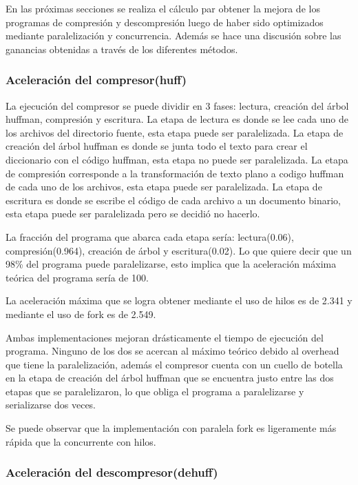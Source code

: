 \documentclass{report}
\begin{document}
En las próximas secciones se realiza el cálculo par obtener la mejora de los programas de compresión y descompresión luego de haber sido optimizados mediante paralelización y concurrencia. Además se hace una discusión sobre las ganancias obtenidas a través de los diferentes métodos.

\subsubsection{Aceleración del compresor(huff)}

La ejecución del compresor se puede dividir en 3 fases: lectura, creación del árbol huffman, compresión y escritura. La etapa de lectura es donde se lee cada uno de los archivos del directorio fuente, esta etapa puede ser paralelizada.  La etapa de creación del  árbol huffman es donde se junta todo el texto para crear el diccionario con el código huffman, esta etapa no puede ser paralelizada. La etapa de compresión corresponde a la transformación de texto plano a codigo huffman de cada uno de los archivos, esta etapa puede ser paralelizada. La etapa de escritura es donde se escribe el código de cada archivo a un documento binario, esta etapa puede ser paralelizada pero se decidió no hacerlo.

La fracción del programa que abarca cada etapa sería: lectura(0.06), compresión(0.964), creación de árbol y escritura(0.02).  Lo que quiere decir que un 98\% del programa puede paralelizarse, esto implica que la aceleración máxima teórica del programa sería de 100.

La aceleración máxima que se logra obtener mediante el uso de hilos es de 2.341 y mediante el uso de fork es de 2.549. 

Ambas implementaciones mejoran drásticamente el tiempo de ejecución del programa. Ninguno de los dos se acercan al máximo teórico debido al overhead que tiene la paralelización, además el compresor cuenta con un cuello de botella en la etapa de creación del árbol huffman que se encuentra justo entre las dos etapas que se paralelizaron, lo que obliga el programa  a paralelizarse y serializarse dos veces.

Se puede observar que la implementación con paralela  fork es ligeramente más rápida que la  concurrente con hilos.

\subsubsection{Aceleración del descompresor(dehuff)}
\end{document}
